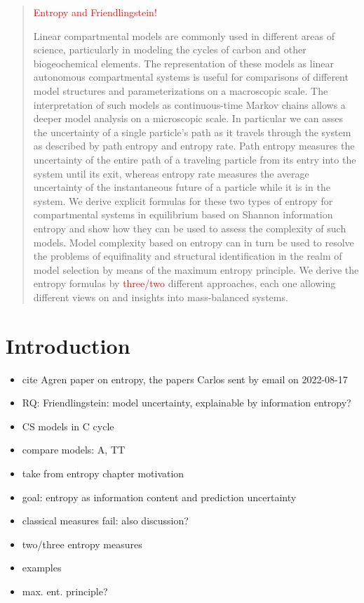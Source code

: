 \documentclass[smallextended]{svjour3}
\newcommand{\red}[1]{\textcolor{red}{#1}}
\begin{document}
\begin{abstract}
\red{Entropy and Friendlingstein!}

Linear compartmental models are commonly used in different areas of science, particularly in modeling the cycles of carbon and other biogeochemical elements.
The representation of these models as linear autonomous compartmental systems is useful for comparisons of different model structures and parameterizations on a macroscopic scale.
The interpretation of such models as continuous-time Markov chains allows a deeper model analysis on a microscopic scale.
In particular we can asses the uncertainty of a single particle's path as it travels through the system as described by path entropy and entropy rate.
Path entropy measures the uncertainty of the entire path of a traveling particle from its entry into the system until its exit, whereas entropy rate measures the average uncertainty of the instantaneous future of a particle while it is in the system.
We derive explicit formulas for these two types of entropy for compartmental systems in equilibrium based on Shannon information entropy and show how they can be used to assess the complexity of such models.
Model complexity based on entropy can in turn be used to resolve the problems of equifinality and structural identification in the realm of model selection by means of the maximum entropy principle.
We derive the entropy formulas by \red{three/two} different approaches, each one allowing different views on and insights into mass-balanced systems.


\subclass{\red{34A30 \and 60J28 \and 60K20 \and 92B05}}
\end{abstract}

\section{Introduction}\label{intro}
\begin{itemize}
  \item cite Agren paper on entropy, the papers Carlos sent by email on 2022-08-17
  \item RQ: Friendlingstein: model uncertainty, explainable by information entropy?
  \item CS models in C cycle
  \item compare models: A, TT
  \item take from entropy chapter motivation
  \item goal: entropy as information content and prediction uncertainty
  \item classical measures fail: also discussion?
  \item two/three entropy measures
  \item examples
  \item max. ent. principle?
\end{itemize}
\end{document}
